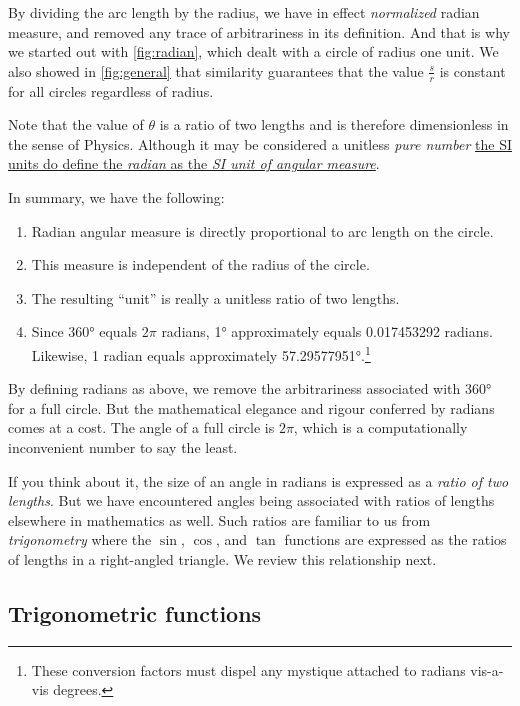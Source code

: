 \documentclass[
  a4paper,
]{article}
\providecommand{\tightlist}{%
  \setlength{\itemsep}{0pt}\setlength{\parskip}{0pt}}
\begin{document}
By dividing the arc length by the radius, we have in effect
\emph{normalized} radian measure, and removed any trace of arbitrariness
in its definition. And that is why we started out with
\cref{fig:radian}, which dealt with a circle of radius one unit. We also
showed in \cref{fig:general} that similarity guarantees that the value
\(\frac{s}{r}\) is constant for all circles regardless of radius.

Note that the value of \(\theta\) is a ratio of two lengths and is
therefore dimensionless in the sense of Physics. Although it may be
considered a unitless \emph{pure number}
\href{https://en.wikipedia.org/wiki/Radian}{the SI units do define the
\emph{radian} as the \emph{SI unit of angular measure}}.

In summary, we have the following:

\begin{enumerate}
\tightlist
\item
  Radian angular measure is directly proportional to arc length on the
  circle.
\item
  This measure is independent of the radius of the circle.
\item
  The resulting ``unit'' is really a unitless ratio of two lengths.
\item
  Since 360° equals \(2\pi\) radians, 1° approximately equals
  0.017453292 radians. Likewise, 1 radian equals approximately
  57.29577951°.\footnote{These conversion factors must dispel any
    mystique attached to radians vis-a-vis degrees.}
\end{enumerate}

By defining radians as above, we remove the arbitrariness associated
with 360° for a full circle. But the mathematical elegance and rigour
conferred by radians comes at a cost. The angle of a full circle is
\(2\pi\), which is a computationally inconvenient number to say the
least.

If you think about it, the size of an angle in radians is expressed as a
\emph{ratio of two lengths}. But we have encountered angles being
associated with ratios of lengths elsewhere in mathematics as well. Such
ratios are familiar to us from \emph{trigonometry} where the \(\sin\),
\(\cos\), and \(\tan\) functions are expressed as the ratios of lengths
in a right-angled triangle. We review this relationship next.

\hypertarget{trigonometric-functions}{%
\subsection{Trigonometric functions}\label{trigonometric-functions}}
\end{document}

